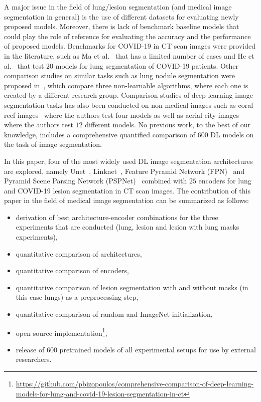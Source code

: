 \documentclass{elsarticle}
\begin{document}
A major issue in the field of lung/lesion segmentation (and medical image segmentation in general) is the use of different datasets for evaluating newly proposed models.
Moreover, there is lack of benchmark baseline models that could play the role of reference for evaluating the accuracy and the performance of proposed models.
Benchmarks for COVID-19 in CT scan images were provided in the literature, such as Ma et al.~\cite{ma2020towards} that has a limited number of cases and He et al.~\cite{he2020benchmarking} that test $20$ models for lung segmentation of COVID-19 patients.
Other comparison studies on similar tasks such as lung nodule segmentation were proposed in~\cite{kalpathy2016comparison}, which compare three non-learnable algorithms, where each one is created by a different research group.
Comparison studies of deep learning image segmentation tasks has also been conducted on non-medical images such as coral reef images~\cite{king2018comparison} where the authors test four models as well as aerial city images~\cite{liu2018comparison} where the authors test $12$ different models.
No previous work, to the best of our knowledge, includes a comprehensive quantified comparison of $600$ DL models on the task of image segmentation.

In this paper, four of the most widely used DL image segmentation architectures are explored, namely Unet~\cite{ronneberger2015u}, Linknet~\cite{chaurasia2017linknet}, Feature Pyramid Network (FPN)~\cite{lin2017feature} and Pyramid Scene Parsing Network (PSPNet)~\cite{zhao2017pyramid} combined with $25$ encoders for lung and COVID-19 lesion segmentation in CT scan images.
The contribution of this paper in the field of medical image segmentation can be summarized as follows:
\begin{itemize}
  \item derivation of best architecture-encoder combinations for the three experiments that are conducted (lung, lesion and lesion with lung masks experiments),
  \item quantitative comparison of architectures,
  \item quantitative comparison of encoders,
  \item quantitative comparison of lesion segmentation with and without masks (in this case lungs) as a preprocessing step,
  \item quantitative comparison of random and ImageNet initialization,
  \item open source implementation\footnote{\url{https://github.com/pbizopoulos/comprehensive-comparison-of-deep-learning-models-for-lung-and-covid-19-lesion-segmentation-in-ct}},
  \item release of $600$ pretrained models of all experimental setups for use by external researchers.
\end{itemize}
\end{document}
